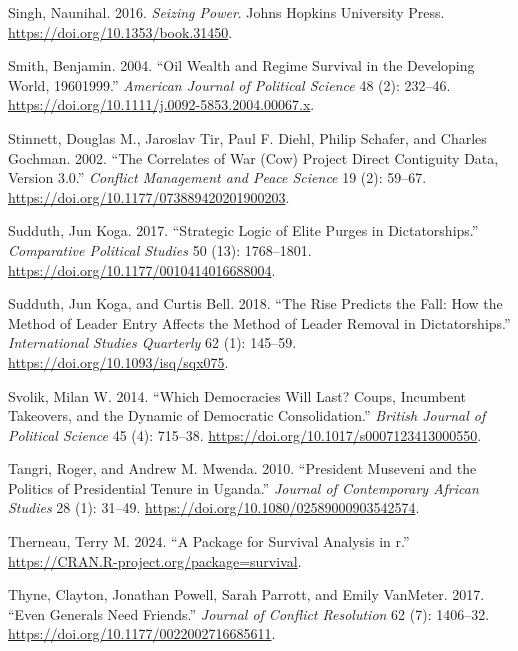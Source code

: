 \documentclass[
  12pt,
]{report}
\newlength{\cslhangindent}
\newenvironment{CSLReferences}[2] %
 {\begin{list}{}{%
  \setlength{\itemindent}{0pt}
  \setlength{\leftmargin}{0pt}
  \setlength{\parsep}{0pt}
  \ifodd #1
   \setlength{\leftmargin}{\cslhangindent}
   \setlength{\itemindent}{-1\cslhangindent}
  \fi
  \setlength{\itemsep}{#2\baselineskip}}}
 {\end{list}}
\begin{document}
\begin{CSLReferences}{1}{0}
Singh, Naunihal. 2016. \emph{Seizing Power}. Johns Hopkins University
Press. \url{https://doi.org/10.1353/book.31450}.

Smith, Benjamin. 2004. {``Oil Wealth and Regime Survival in the
Developing World, 1960{\textendash}1999.''} \emph{American Journal of
Political Science} 48 (2): 232--46.
\url{https://doi.org/10.1111/j.0092-5853.2004.00067.x}.

Stinnett, Douglas M., Jaroslav Tir, Paul F. Diehl, Philip Schafer, and
Charles Gochman. 2002. {``The Correlates of War (Cow) Project Direct
Contiguity Data, Version 3.0.''} \emph{Conflict Management and Peace
Science} 19 (2): 59--67.
\url{https://doi.org/10.1177/073889420201900203}.

Sudduth, Jun Koga. 2017. {``Strategic Logic of Elite Purges in
Dictatorships.''} \emph{Comparative Political Studies} 50 (13):
1768--1801. \url{https://doi.org/10.1177/0010414016688004}.

Sudduth, Jun Koga, and Curtis Bell. 2018. {``The Rise Predicts the Fall:
How the Method of Leader Entry Affects the Method of Leader Removal in
Dictatorships.''} \emph{International Studies Quarterly} 62 (1):
145--59. \url{https://doi.org/10.1093/isq/sqx075}.

Svolik, Milan W. 2014. {``Which Democracies Will Last? Coups, Incumbent
Takeovers, and the Dynamic of Democratic Consolidation.''} \emph{British
Journal of Political Science} 45 (4): 715--38.
\url{https://doi.org/10.1017/s0007123413000550}.

Tangri, Roger, and Andrew M. Mwenda. 2010. {``President Museveni and the
Politics of Presidential Tenure in Uganda.''} \emph{Journal of
Contemporary African Studies} 28 (1): 31--49.
\url{https://doi.org/10.1080/02589000903542574}.

Therneau, Terry M. 2024. {``A Package for Survival Analysis in r.''}
\url{https://CRAN.R-project.org/package=survival}.

Thyne, Clayton, Jonathan Powell, Sarah Parrott, and Emily VanMeter.
2017. {``Even Generals Need Friends.''} \emph{Journal of Conflict
Resolution} 62 (7): 1406--32.
\url{https://doi.org/10.1177/0022002716685611}.


\end{CSLReferences}
\end{document}
